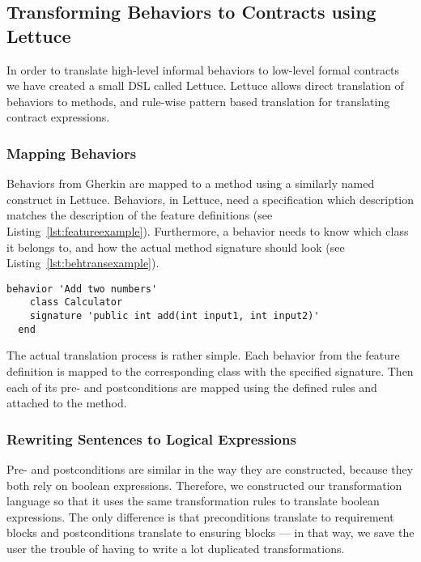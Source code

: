 \subsection{Transforming Behaviors to Contracts using Lettuce}
\label{sub:Transforming Behaviors to Contracts using Lettuce}

In order to translate high-level informal behaviors to low-level formal
contracts we have created a small DSL called Lettuce.
Lettuce allows direct translation of behaviors to methods,
and rule-wise pattern based translation for translating contract expressions.

\subsubsection{Mapping Behaviors}
\label{sub:Mapping Behaviors}

Behaviors from Gherkin are mapped to a method using a similarly named
construct in Lettuce. Behaviors, in Lettuce, need a specification which
description matches the description of the feature definitions (see Listing~\ref{lst:featureexample}).
Furthermore, a behavior needs to know which class it belongs to, and how the actual method signature should look
(see Listing~\ref{lst:behtransexample}).

\begin{lstlisting}[caption={General Behavior Description of Adding Natural Numbers},label={lst:behtransexample}]
  behavior 'Add two numbers'
    class Calculator
    signature 'public int add(int input1, int input2)'
  end
\end{lstlisting}

The actual translation process is rather simple. Each behavior from the feature definition is mapped to the
corresponding class with the specified signature. Then each of its pre- 
and postconditions are mapped using the defined rules and attached to the method.

\subsubsection{Rewriting Sentences to Logical Expressions}
\label{sub:RewritingSentencestoLogicalExpressions}

Pre- and postconditions are similar in the way they are constructed, because they both rely on boolean expressions.
Therefore, we constructed our transformation language so that it uses the same transformation rules to translate
boolean expressions. The only difference is that preconditions translate to requirement blocks and postconditions translate to 
ensuring blocks --- in that way, we save the user the trouble of having to write a lot duplicated transformations.

